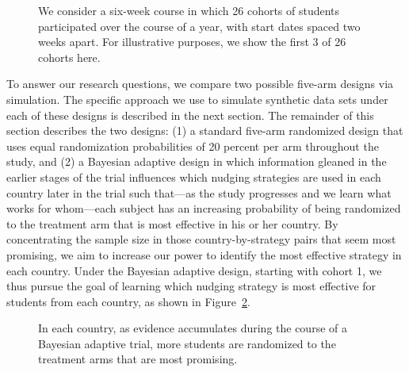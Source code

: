 \documentclass{acm_proc_article-sp}
\begin{document}
\begin{figure}
\centering
{}
\caption{We consider a six-week course in which 26 cohorts of students participated over the course of a year, with start dates spaced two weeks apart. For illustrative purposes, we show the first 3 of 26 cohorts here.}
\label{fig:timeline}
\end{figure}

To answer our research questions, we compare two possible five-arm designs via simulation. 
The specific approach we use to simulate synthetic data sets under each of these designs is described in the next section. 
The remainder of this section describes the two designs: (1) a standard five-arm randomized design that uses equal randomization probabilities of 20 percent per arm throughout the study, and (2) a Bayesian adaptive design in which information gleaned in the earlier stages of the trial influences which nudging strategies are used in each country later in the trial such that—as the study progresses and we learn what works for whom—each subject has an increasing probability of being randomized to the treatment arm that is most effective in his or her country. 
By concentrating the sample size in those country-by-strategy pairs that seem most promising, we aim to increase our power to identify the most effective strategy in each country. 
Under the Bayesian adaptive design, starting with cohort 1, we thus pursue the goal of learning which nudging strategy is most effective for students from each country, as shown in Figure~\ref{fig:timeline2}. 

\begin{figure}
\centering
{}
\caption{In each country, as evidence accumulates during the course of a Bayesian adaptive trial, more students are randomized to the treatment arms that are most promising.}
\label{fig:timeline2}
{}
\end{figure}
\end{document}
